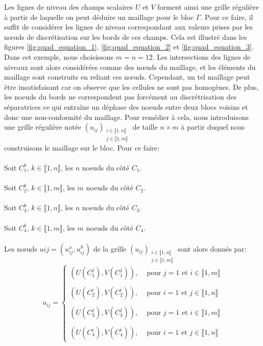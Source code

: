 Les lignes de niveau des champs scalaires $U$ et $V$ forment ainsi une grille régulière à partir de laquelle on peut déduire un maillage pour le bloc $\Gamma$. Pour ce faire, il suffit de considérer les lignes de niveau correspondant aux valeurs prises par les nœuds de discrétisation sur les bords de ces champs. Cela est illustré dans les figures \ref{fig:quad_equation_1}, \ref{fig:quad_equation_2} et \ref{fig:quad_equation_3}. Dans cet exemple, nous choisissons $m=n=12$. Les intersections des lignes de niveaux sont alors considérées comme des nœuds du maillage, et les éléments du maillage sont construits en reliant ces nœuds. Cependant, un tel maillage peut être insatisfaisant car on observe que les cellules ne sont pas homogènes. De plus, les noeuds du bords ne correspondent pas forcément au discrétrisation des séparatrices ce qui entraîne un déphase des noeuds entre deux blocs voisins et donc une non-conformité du maillage. Pour remédier à cela, nous introduisons une grille régulière notée $(u_{ij})_{\substack{i\in\llbracket 1, n\rrbracket\\j\in\llbracket 1, m\rrbracket}}$  de taille $n\times m$ à partir duquel nous construisons le maillage sur le bloc. Pour ce faire:\\\\
Soit $C_1^k$, $k\in\llbracket 1, n\rrbracket$, les $n$ noeuds du côté $C_1$.\\\\
Soit $C_2^k$, $k\in\llbracket 1, m\rrbracket$, les $m$ noeuds du côté $C_2$.\\\\
Soit $C_3^k$, $k\in\llbracket 1, n\rrbracket$, les $n$ noeuds du côté $C_3$.\\\\
Soit $C_4^k$, $k\in\llbracket 1, m\rrbracket$, les $m$ noeuds du côté $C_4$.\\\\
Les nœuds $u{ij}=(u_{ij}^x, u_{ij}^y)$ de la grille $(u_{ij})_{\substack{i\in\llbracket 1, n\rrbracket\\j\in\llbracket 1, m\rrbracket}}$ sont alors  donnés par:
\begin{equation}
u_{ij}=
\left\{
\begin{array}{ll}
(U(C_1^j), V(C_1^j)),&\mbox{ pour } j=1 \mbox{ et } i\in\llbracket 1, m\rrbracket\\\\
(U(C_2^i), V(C_2^i)),&\mbox{ pour } i=1 \mbox{ et } j\in\llbracket 1, n\rrbracket\\\\
(U(C_3^j), V(C_3^j)),&\mbox{ pour } j=1 \mbox{ et } i\in\llbracket 1, m\rrbracket\\\\
(U(C_4^i), V(C_4^i)),&\mbox{ pour } i=1 \mbox{ et } j\in\llbracket 1, n\rrbracket
\end{array}
\right.
\end{equation}
